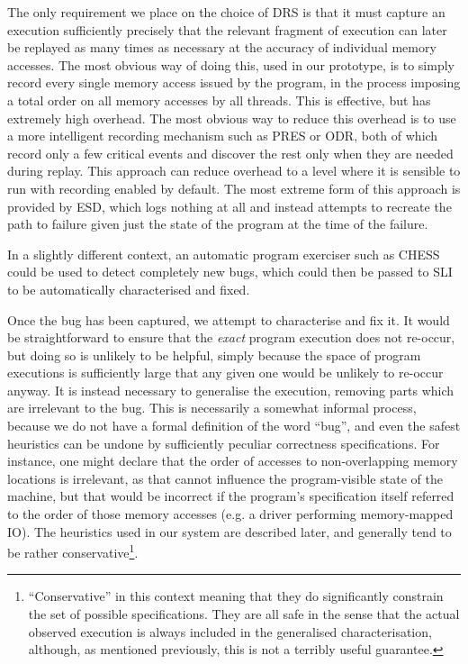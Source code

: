 \documentclass[10pt,a4paper]{report}
\begin{document}
The only requirement we place on the choice of DRS is that it must
capture an execution sufficiently precisely that the relevant fragment
of execution can later be replayed as many times as necessary at the
accuracy of individual memory accesses.  The most obvious way of doing
this, used in our prototype, is to simply record every single memory
access issued by the program, in the process imposing a total order on
all memory accesses by all threads.  This is effective, but has
extremely high overhead.  The most obvious way to reduce this overhead
is to use a more intelligent recording mechanism such as
PRES\needCite{} or ODR\needCite{}, both of which record only a few
critical events and discover the rest only when they are needed during
replay.  This approach can reduce overhead to a level where it is
sensible to run with recording enabled by default.  The most extreme
form of this approach is provided by ESD\needCite{}, which logs
nothing at all and instead attempts to recreate the path to failure
given just the state of the program at the time of the failure.

In a slightly different context, an automatic program exerciser such
as CHESS\needCite{} could be used to detect completely new bugs, which
could then be passed to SLI to be automatically characterised and
fixed.

Once the bug has been captured, we attempt to characterise and fix it.
It would be straightforward to ensure that the \emph{exact} program
execution does not re-occur, but doing so is unlikely to be helpful,
simply because the space of program executions is sufficiently large
that any given one would be unlikely to re-occur anyway.  It is instead necessary to
generalise the execution, removing parts which are irrelevant to the
bug.  This is necessarily a somewhat informal process, because we do
not have a formal definition of the word ``bug'', and even the safest
heuristics can be undone by sufficiently peculiar correctness
specifications.  For instance, one might declare that the order of
accesses to non-overlapping memory locations is irrelevant, as that
cannot influence the program-visible state of the machine, but that
would be incorrect if the program's specification itself referred to
the order of those memory accesses (e.g. a driver performing
memory-mapped IO).  The heuristics used in our system are described
later, and generally tend to be rather
conservative\footnote{``Conservative'' in this context meaning that
  they do significantly constrain the set of possible specifications.
  They are all safe in the sense that the actual observed execution is
  always included in the generalised characterisation, although, as
  mentioned previously, this is not a terribly useful guarantee.}.
\end{document}
